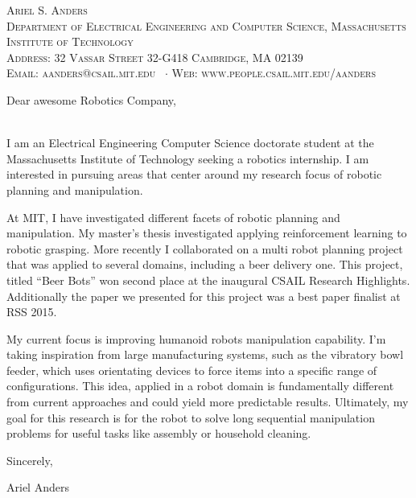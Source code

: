 \documentclass[10pt,letterpaper]{article}
\newcommand{\namestyle}{\Huge \scshape}
\newcommand{\deptstyle}{\footnotesize \rmfamily \scshape}
\newcommand{\addressstyle}{\footnotesize \rmfamily \upshape}
\begin{document}
\iffalse
\begin{center}
\namestyle Ariel S. Anders \\[0.3em]
\deptstyle Department of Electrical Engineering and Computer Science, Massachusetts Institute of Technology \\[0.2em]
\addressstyle Address: 32 Vassar Street 32-G418 Cambridge, MA 02139\\
Email: aanders@csail.mit.edu \ $\cdot$ Web: www.people.csail.mit.edu/aanders
\end{center}


Dear awesome Robotics Company, \\
\\\par
I am an Electrical Engineering Computer Science doctorate student at the Massachusetts Institute of Technology seeking a robotics internship.  I am interested in pursuing areas that center around my research focus of robotic planning and manipulation. \par 
At MIT, I have investigated different facets of robotic planning and manipulation. My master’s thesis investigated applying reinforcement learning to robotic grasping.  More recently I collaborated on a multi robot planning project that was applied to several domains, including a beer delivery one.  This project, titled ``Beer Bots'' won second place at the inaugural CSAIL Research Highlights. Additionally the paper we presented for this project was a best paper finalist at RSS 2015.   \par 

My current focus is improving  humanoid robots manipulation capability.  I'm taking inspiration from large manufacturing  systems, such as the vibratory bowl feeder, which uses orientating devices to force items into a specific range of configurations.  This idea, applied in a robot domain is fundamentally different from current approaches and could yield more predictable results. Ultimately, my goal for this research is for the robot to solve long sequential manipulation problems for useful tasks like assembly or household cleaning.

Sincerely,\\ \par
Ariel Anders
\end{document}
